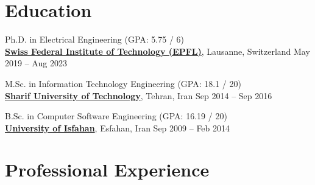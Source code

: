 \documentclass[11pt]{article}
\begin{document}
\section{Education}
\begin{outerlist}

	\item Ph.D. in Electrical Engineering (GPA: 5.75 / 6)\\
	\href{https://www.epfl.ch/en/home/}{\textbf{Swiss Federal Institute of Technology (EPFL)}}, Lausanne, Switzerland \hfill {May 2019 -- Aug 2023}

	\item M.Sc. in Information Technology Engineering (GPA: 18.1 / 20)\\
	\href{http://www.en.sharif.edu/}{\textbf{Sharif University of Technology}}, Tehran, Iran \hfill {Sep 2014 -- Sep 2016}

	\item B.Sc. in Computer Software Engineering (GPA: 16.19 / 20)\\
	\href{http://ui.ac.ir/EN}{\textbf{University of Isfahan}}, Esfahan, Iran \hfill {Sep 2009 -- Feb 2014}

\end{outerlist}


\section{Professional Experience}
\end{document}
